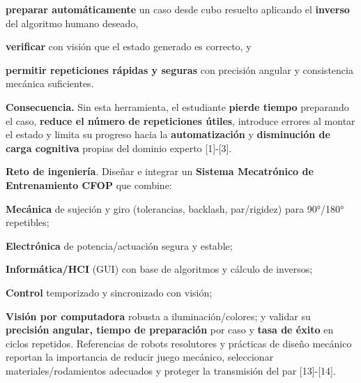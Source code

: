 \textbf{preparar automáticamente} un caso desde cubo resuelto aplicando el \textbf{inverso} del algoritmo humano deseado,

\textbf{verificar} con visión que el estado generado es correcto, y

\textbf{permitir repeticiones rápidas y seguras} con precisión angular y consistencia mecánica suficientes.

\textbf{Consecuencia.} Sin esta herramienta, el estudiante \textbf{pierde tiempo} preparando el caso, \textbf{reduce el número de repeticiones útiles}, introduce errores al montar el estado y limita su progreso hacia la \textbf{automatización} y \textbf{disminución de carga cognitiva} propias del dominio experto [1]-[3].

\textbf{Reto de ingeniería}. Diseñar e integrar un \textbf{Sistema Mecatrónico de Entrenamiento CFOP} que combine:

\textbf{Mecánica} de sujeción y giro (tolerancias, backlash, par/rigidez) para 90°/180° repetibles;

\textbf{Electrónica} de potencia/actuación segura y estable;

\textbf{Informática/HCI} (GUI) con base de algoritmos y cálculo de inversos;

\textbf{Control} temporizado y sincronizado con visión;

\textbf{Visión por computadora} robusta a iluminación/colores;
y validar su \textbf{precisión angular, tiempo de preparación} por caso y \textbf{tasa de éxito} en ciclos repetidos. Referencias de robots resolutores y prácticas de diseño mecánico reportan la importancia de reducir juego mecánico, seleccionar materiales/rodamientos adecuados y proteger la transmisión del par [13]-[14].

